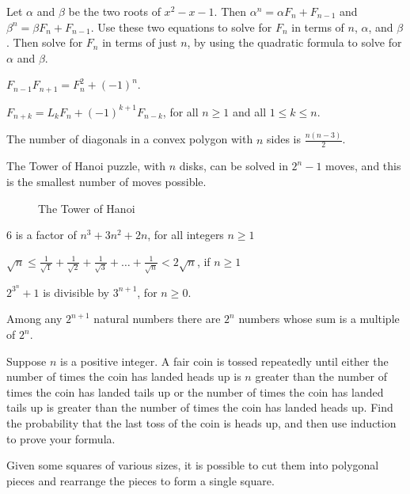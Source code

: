 \documentclass[12pt]{amsart}
\theoremstyle{definition}
\begin{document}
\problem Let $\alpha$ and $\beta$ be the two roots of $x^2-x-1$. Then $\alpha^n=\alpha F_n+F_{n-1}$ and $\beta^n=\beta F_n+F_{n-1}$.
Use these two equations to solve for $F_n$ in terms of $n$, $\alpha$, and $\beta$. Then solve for $F_n$ in terms of just $n$, by using the quadratic formula to solve for $\alpha$ and $\beta$. \vspace{.05in}%

\problem $F_{n-1}F_{n+1}=F_n^2+(-1)^n$. \vspace{.05in}

\problem $F_{n+k}=L_kF_n+(-1)^{k+1}F_{n-k}$, for all $n\geq 1$ and all $1\leq k\leq n$. \vspace{.05in}

\problem The number of diagonals in a convex polygon with $n$ sides is $\frac{n(n-3)}{2}$.

\problem The Tower of Hanoi puzzle, with $n$ disks, can be solved in $2^n-1$ moves, and this is the smallest number of moves possible.

\begin{figure}[h]
	\caption{The Tower of Hanoi}
\end{figure}

\problem $6$ is a factor of $n^3+3n^2+2n$, for all integers $n\geq 1$

\problem $\sqrt{n}\leq \frac{1}{\sqrt1}+\frac{1}{\sqrt2}+\frac{1}{\sqrt3}+\dots +\frac{1}{\sqrt{n}}< 2\sqrt{n}$, if $n\geq 1$

\problem $2^{3^n}+1$ is divisible by $3^{n+1}$, for $n\geq 0$.

\problem Among any $2^{n+1}$ natural numbers there are $2^n$ numbers whose sum is a multiple of $2^n$.%

\problem Suppose $n$ is a positive integer. A fair coin is tossed repeatedly until either the number of times the coin has landed heads up is $n$ greater than the number of times the coin has landed tails up or the number of times the coin has landed tails up is greater than the number of times the coin has landed heads up. Find the probability that the last toss of the coin is heads up, and then use induction to prove your formula.

\newpage

\problem Given some squares of various sizes, it is possible to cut them into polygonal pieces and rearrange the pieces to form a single square.
\begin{figure}[h]
\end{figure}
\end{document}
